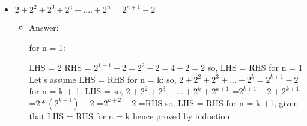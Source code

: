 \documentclass[11pt]{article}
\begin{document}
\begin{itemize}

\item $ 2 + 2^{2} + 2^{3} + 2^{4} + .... + 2^{n} = 2^{n+1} - 2 $

\begin{itemize}

\item Answer: 

for n = 1:

LHS = 2
\newline RHS = $2^{1+1} -2 = 2^{2} - 2 = 4 -2 = 2$
\newline so, LHS = RHS for n = 1
\newline Let's assume LHS = RHS for n = k:
\newline so, $2 + 2^{2} + 2^{3} + ... + 2^{k} = 2^{k+1} - 2 $
\newline for n = k + 1:
\newline LHS = so, $2 + 2^{2} + 2^{3} + ... + 2^{k} + 2^{k+1}$
\newline =$ 2^{k+1} - 2 + 2^{k+1}$
\newline =$ 2*(2^{k+1}) - 2$
\newline =$ 2^{k+2} -2 $
\newline =RHS
\newline so, LHS = RHS for n = k +1, given that LHS = RHS for n = k 
\newline hence proved by induction


\end{itemize} 

\end{itemize} 
\end{document}
